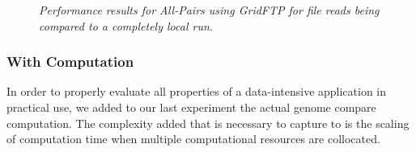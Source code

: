 \documentclass{rspublic}
\begin{document}
\begin{center}
\begin{figure}[ht]
\caption{\textit{Performance results for All-Pairs using GridFTP for
file reads being compared to a completely local run.}}
\label{Fig:ExpIConventionalLocal}
\end{figure}
\end{center}

\subsubsection{With Computation} 
In order to properly evaluate all properties of a data-intensive
application in practical use, we added to our last experiment the actual genome
compare computation.  The complexity added that is necessary to capture to is
the scaling of computation time when multiple computational resources are
collocated.
\end{document}
